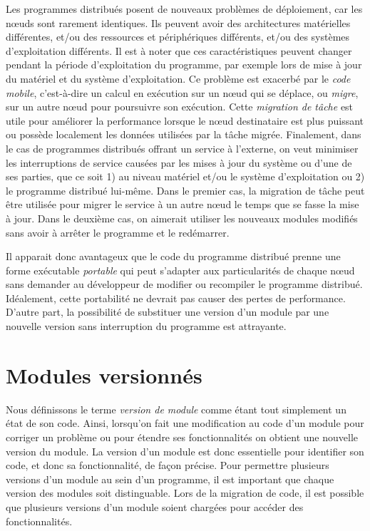 Les programmes distribués posent de nouveaux problèmes de déploiement,
car les nœuds sont rarement identiques.  Ils peuvent avoir des
architectures matérielles différentes, et/ou des ressources et
périphériques différents, et/ou des systèmes d'exploitation
différents.  Il est à noter que ces caractéristiques peuvent changer
pendant la période d'exploitation du programme, par exemple lors de
mise à jour du matériel et du système d'exploitation.  Ce problème est
exacerbé par le \textit{code mobile}, c'est-à-dire un calcul en
exécution sur un nœud qui se déplace, ou \textit{migre}, sur un autre
nœud pour poursuivre son exécution.  Cette \textit{migration de
  tâche} est utile pour améliorer la performance lorsque le nœud
destinataire est plus puissant ou possède localement les données
utilisées par la tâche migrée.  Finalement, dans le cas de programmes
distribués offrant un service à l'externe, on veut minimiser les
interruptions de service causées par les mises à jour du système ou
d'une de ses parties, que ce soit 1) au niveau matériel et/ou le
système d'exploitation ou 2) le programme distribué lui-même.  Dans le
premier cas, la migration de tâche peut être utilisée pour migrer le
service à un autre nœud le temps que se fasse la mise à jour.  Dans
le deuxième cas, on aimerait utiliser les nouveaux modules
modifiés sans avoir à arrêter le programme et le redémarrer.

Il apparait donc avantageux que le code du programme distribué prenne
une forme exécutable \textit{portable} qui peut s'adapter aux
particularités de chaque nœud sans demander au développeur de
modifier ou recompiler le programme distribué.  Idéalement, cette
portabilité ne devrait pas causer des pertes de performance.  D'autre
part, la possibilité de substituer une version d'un module par une
nouvelle version sans interruption du programme est attrayante.

\section{Modules versionnés}
%
Nous définissons le terme \textit{version de module} comme étant tout
simplement un état de son code.  Ainsi, lorsqu'on fait une
modification au code d'un module pour corriger un problème ou pour
étendre ses fonctionnalités on obtient une nouvelle version du module.
La version d'un module est donc essentielle pour identifier son code,
et donc sa fonctionnalité, de façon précise. Pour permettre plusieurs
versions d'un module au sein d'un programme, il est important que
chaque version des modules soit distinguable.
Lors de la migration de code, il est possible que plusieurs versions
d'un module soient chargées pour accéder des fonctionnalités.

